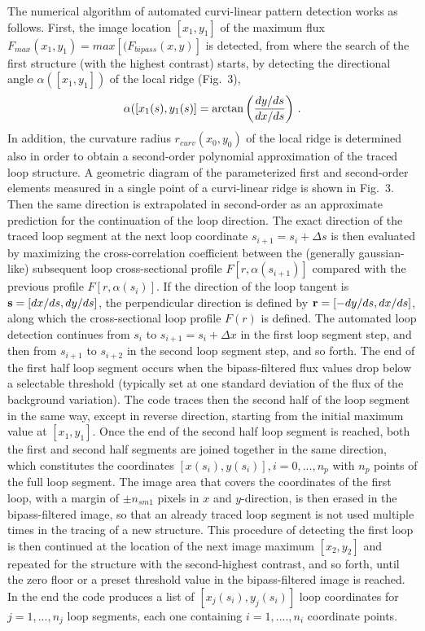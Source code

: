 \documentclass[10pt,preprint]{aastex}  %
\begin{document}
The numerical algorithm of automated curvi-linear pattern detection  
works as follows. First, the image location $[x_1, y_1]$ of the maximum
flux $F_{max}(x_1, y_1) = max[(F_{bipass}(x,y)]$ is detected, from where the search 
of the first structure (with the highest contrast) starts, by detecting
the directional angle $\alpha([x_1, y_1])$ of the local ridge (Fig.~3), 
\begin{equation}
	\alpha([x_1(s), y_1(s)] = \arctan{\left({dy/ds \over dx/ds}\right)}
	\ .
\end{equation}
In addition, the curvature radius $r_{curv}(x_0, y_0)$
of the local ridge is determined also in order to obtain a second-order
polynomial approximation of the traced loop structure. A geometric
diagram of the parameterized first and second-order elements measured
in a single point of a curvi-linear ridge is shown in Fig.~3. Then the same
direction is extrapolated in second-order as an approximate prediction
for the continuation of the loop direction. The exact direction of the
traced loop segment at the next loop coordinate $s_{i+1}=s_i + \Delta s$ 
is then evaluated by maximizing the cross-correlation coefficient between the 
(generally gaussian-like) subsequent loop cross-sectional profile 
$F[r, \alpha(s_{i+1})]$ compared with the previous profile 
$F[r, \alpha(s_{i})]$. If the direction of the loop tangent is
${\bf s}=[dx/ds, dy/ds]$, the perpendicular direction is defined by
${\bf r}=[-dy/ds, dx/ds]$, along which the cross-sectional loop
profile $F(r)$ is defined. The automated loop detection continues
from $s_i$ to $s_{i+1}=s_i + \Delta x$ in the first loop segment step, 
and then from $s_{i+1}$ to $s_{i+2}$ in the second loop segment step, and 
so forth. The end of the first half loop segment occurs when the
bipass-filtered flux values drop below a selectable threshold
(typically set at one standard deviation of the flux of the 
background variation). 
The code traces then the second half of the loop segment in the same way,
except in reverse direction, starting from the initial maximum value
at $[x_1,y_1]$. Once the end of the second half loop segment
is reached, both the first and second half segments are joined together
in the same direction, which constitutes the coordinates 
$[x(s_i), y(s_i)], i=0,...,n_p$ with $n_p$ points of the full loop
segment. The image area that covers the coordinates of the first loop,
with a margin of $\pm n_{sm1}$ pixels in $x$ and $y$-direction,
is then erased in the bipass-filtered image, so that an already traced 
loop segment is not used multiple times in the tracing of a new 
structure. This procedure of detecting the first
loop is then continued at the location of the next image maximum 
$[x_2, y_2]$ and repeated for the structure with the 
second-highest contrast, and so forth, until the zero floor or a
preset threshold value in the bipass-filtered image is reached. 
In the end the code produces 
a list of $[x_j(s_i), y_j(s_i)]$ loop coordinates for $j=1,...,n_{j}$
loop segments, each one containing $i=1,....,n_i$ coordinate points. 
\end{document}

